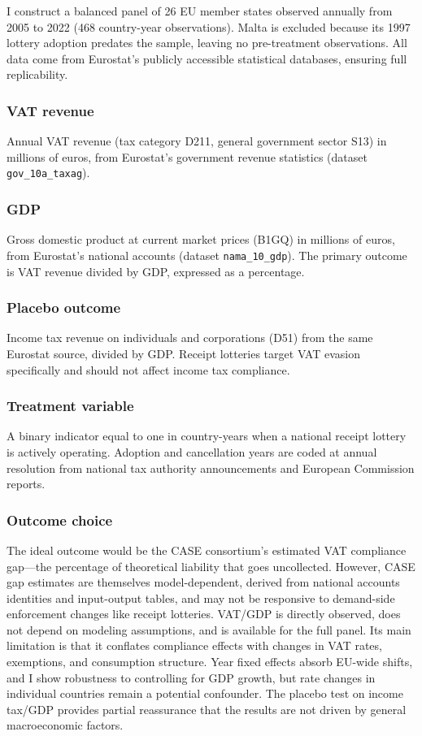 \documentclass[12pt]{article}
\begin{document}
I construct a balanced panel of 26 EU member states observed annually from 2005 to 2022 (468 country-year observations). Malta is excluded because its 1997 lottery adoption predates the sample, leaving no pre-treatment observations. All data come from Eurostat's publicly accessible statistical databases, ensuring full replicability.

\subsubsection*{VAT revenue} Annual VAT revenue (tax category D211, general government sector S13) in millions of euros, from Eurostat's government revenue statistics (dataset \texttt{gov\_10a\_taxag}).

\subsubsection*{GDP} Gross domestic product at current market prices (B1GQ) in millions of euros, from Eurostat's national accounts (dataset \texttt{nama\_10\_gdp}). The primary outcome is VAT revenue divided by GDP, expressed as a percentage.

\subsubsection*{Placebo outcome} Income tax revenue on individuals and corporations (D51) from the same Eurostat source, divided by GDP. Receipt lotteries target VAT evasion specifically and should not affect income tax compliance.

\subsubsection*{Treatment variable} A binary indicator equal to one in country-years when a national receipt lottery is actively operating. Adoption and cancellation years are coded at annual resolution from national tax authority announcements and European Commission reports.

\subsubsection*{Outcome choice} The ideal outcome would be the CASE consortium's estimated VAT compliance gap---the percentage of theoretical liability that goes uncollected. However, CASE gap estimates are themselves model-dependent, derived from national accounts identities and input-output tables, and may not be responsive to demand-side enforcement changes like receipt lotteries. VAT/GDP is directly observed, does not depend on modeling assumptions, and is available for the full panel. Its main limitation is that it conflates compliance effects with changes in VAT rates, exemptions, and consumption structure. Year fixed effects absorb EU-wide shifts, and I show robustness to controlling for GDP growth, but rate changes in individual countries remain a potential confounder. The placebo test on income tax/GDP provides partial reassurance that the results are not driven by general macroeconomic factors.
\end{document}
